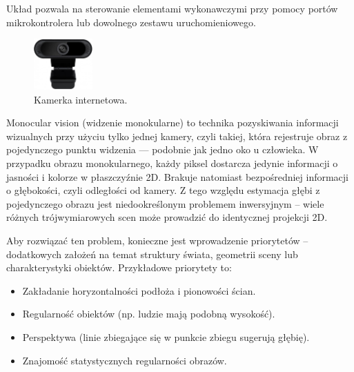 \documentclass[magisterska]{pracadypl}
\begin{document}
Układ pozwala na sterowanie elementami wykonawczymi przy pomocy portów mikrokontrolera lub dowolnego zestawu uruchomieniowego.

\begin{figure}[H]  %
    \centering  %
    \includegraphics[width=0.2\textwidth]{images/MONO.png}  %
    \captionsetup{font=footnotesize}
    \caption[Kamerka internetowa. https://cell-kom.com/inne/21454-kamera-internetowa-full-hd-b16-1080p-5900217390350.html]{Kamerka internetowa.}
    \label{fig:mono}  %
\end{figure}

Monocular vision (widzenie monokularne) to technika pozyskiwania informacji wizualnych przy użyciu tylko jednej kamery, czyli takiej, która rejestruje obraz z pojedynczego punktu widzenia — podobnie jak jedno oko u człowieka.
W przypadku obrazu monokularnego, każdy piksel dostarcza jedynie informacji o jasności i kolorze w płaszczyźnie 2D. Brakuje natomiast bezpośredniej informacji o głębokości, czyli odległości od kamery. Z tego względu estymacja głębi z pojedynczego obrazu jest niedookreślonym problemem inwersyjnym – wiele różnych trójwymiarowych scen może prowadzić do identycznej projekcji 2D.

Aby rozwiązać ten problem, konieczne jest wprowadzenie priorytetów – dodatkowych założeń na temat struktury świata, geometrii sceny lub charakterystyki obiektów. Przykładowe priorytety to:

\begin{itemize}
  \item Zakładanie horyzontalności podłoża i pionowości ścian.

  \item Regularność obiektów (np. ludzie mają podobną wysokość).

  \item Perspektywa (linie zbiegające się w punkcie zbiegu sugerują głębię).

  \item Znajomość statystycznych regularności obrazów.
\end{itemize}
\end{document}
